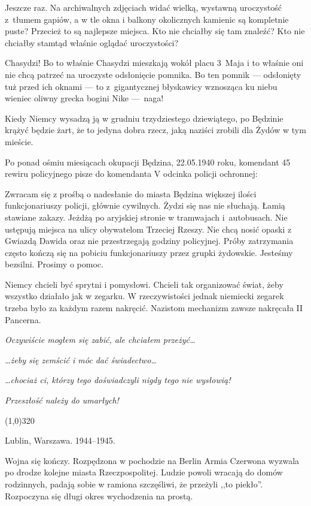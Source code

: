 \documentclass[11pt,a4paper,oneside]{article}
\begin{document}
Jeszcze raz. Na archiwalnych zdjęciach widać wielką, wystawną
uroczystość z~tłumem gapiów, a w tle okna i balkony okolicznych
kamienic są kompletnie puste?  Przecież to są najlepsze miejsca. Kto
nie chciałby się tam znaleźć?  Kto nie chciałby stamtąd właśnie
oglądać uroczystości?

Chasydzi! Bo to właśnie Chasydzi mieszkają wokół placu 3~Maja i to
właśnie oni nie chcą patrzeć na uroczyste odsłonięcie pomnika. Bo ten
pomnik --- odsłonięty tuż przed ich oknami --- to z~gigantycznej błyskawicy
wznosząca ku niebu wieniec oliwny grecka bogini Nike ---~naga!

Kiedy Niemcy wysadzą ją w grudniu trzydziestego dziewiątego, po
Będzinie krążyć będzie żart, że to jedyna dobra rzecz, jaką naziści
zrobili dla Żydów w tym mieście.

Po ponad ośmiu miesiącach okupacji Będzina, 22.05.1940 roku, komendant
45 rewiru policyjnego pisze do komendanta V odcinka policji 
ochronnej:

Zwracam się z prośbą o nadesłanie do miasta Będzina większej ilości
funkcjonariuszy policji, głównie cywilnych.  Żydzi się nas nie
słuchają. Łamią stawiane zakazy. Jeżdżą po aryjskiej stronie
w tramwajach i~autobusach. Nie ustępują miejsca na ulicy obywatelom
Trzeciej Rzeszy. Nie chcą nosić opaski z Gwiazdą Dawida oraz nie
przestrzegają godziny policyjnej. Próby zatrzymania często kończą się
na pobiciu funkcjonariuszy przez grupki żydowskie.  Jesteśmy bezsilni.
Prosimy o pomoc.

Niemcy chcieli być sprytni i pomysłowi. Chcieli tak organizować świat,
żeby wszystko działało jak w zegarku. W rzeczywistości jednak
niemiecki zegarek trzeba było za każdym razem nakręcić. Nazistom
mechanizm zawsze nakręcała II Pancerna. 

\emph{Oczywiście mogłem się zabić, ale chciałem przeżyć\dots{}} 

\emph{\dots{}żeby się zemścić i móc dać świadectwo\dots{}}

\emph{\dots{}chociaż ci, którzy tego doświadczyli nigdy tego nie wysłowią!}

\emph{Przeszłość należy do umarłych!}

\line(1,0){320}

Lublin, Warszawa. 1944--1945. 

Wojna się kończy. Rozpędzona w pochodzie na Berlin Armia Czerwona
wyzwala po drodze kolejne miasta Rzeczpospolitej. Ludzie powoli
wracają do domów rodzinnych, padają sobie w ramiona szczęśliwi, że
przeżyli ,,to piekło''. Rozpoczyna się długi okres wychodzenia na
prostą.
\end{document}
